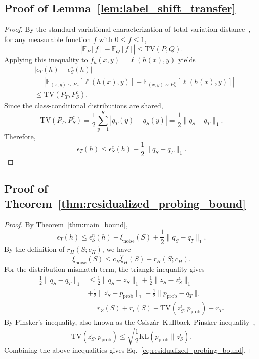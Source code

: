 \subsection{Proof of Lemma~\ref{lem:label_shift_transfer}}
\begin{proof}
By the standard variational characterization of total variation distance~\cite{gibbs2002choosing}, for any measurable function $f$ with $0\le f\le 1$,
\[
\left|
\mathbb E_P[f]-\mathbb E_Q[f]
\right|
\le
\mathrm{TV}(P,Q).
\]
Applying this inequality to $f_h(x,y)=\ell(h(x),y)$ yields
\begin{align}
&\big|\epsilon_T(h)-\epsilon_S^c(h)\big| \\
&=
\left|
\mathbb{E}_{(x,y)\sim P_T}
\left[
\ell(h(x),y)
\right]
-
\mathbb{E}_{(x,y)\sim P_S^c}
\left[
\ell(h(x),y)
\right]
\right| \\
&\le
\mathrm{TV}(P_T,P_S^c).
\end{align}
Since the class-conditional distributions are shared,
\begin{equation}
\label{eq:TV_equality}
\mathrm{TV}(P_T,P_S^c)
=
\frac{1}{2}
\sum_{y=1}^{K}
\left|
q_T(y)-\bar q_S(y)
\right|
=
\frac{1}{2}
\|\bar q_S-q_T\|_1.
\end{equation}
Therefore,
\[
\epsilon_T(h)
\le
\epsilon_S^c(h)
+
\frac{1}{2}\|\bar q_S-q_T\|_1.
\]
\end{proof}
\subsection{Proof of Theorem~\ref{thm:residualized_probing_bound}}
\begin{proof}
By Theorem~\ref{thm:main_bound},
\begin{equation}
\epsilon_T(h)
\le
\epsilon_S^n(h)
+
\xi_{\mathrm{noise}}(S)
+
\frac12\|\bar q_S-q_T\|_1.
\end{equation}
By the definition of $r_H(S;c_H)$, we have
\begin{equation}
\xi_{\mathrm{noise}}(S)
\le
c_H\widehat{\xi}_{H}(S)
+
r_H(S;c_H).
\end{equation}
For the distribution mismatch term, the triangle inequality gives
\begin{align}
\frac12\|\bar q_S-q_T\|_1
&\le
\frac12\|\bar q_S-z_S\|_1
+
\frac12\|z_S-z_S^\epsilon\|_1
\\&+
\frac12\|z_S^\epsilon-p_{\mathrm{prob}}\|_1
+
\frac12\|p_{\mathrm{prob}}-q_T\|_1\\
&=
r_Z(S)
+
r_\epsilon(S)
+
\mathrm{TV}(z_S^\epsilon,p_{\mathrm{prob}})
+
r_T.
\end{align}
By Pinsker's inequality, also known as the Csisz{\'a}r--Kullback--Pinsker inequality~\cite{pinsker1964information,csiszar1967information},
\begin{equation}
\mathrm{TV}(z_S^\epsilon,p_{\mathrm{prob}})
\le
\sqrt{
\frac12
\mathrm{KL}
\left(
p_{\mathrm{prob}}\|z_S^\epsilon
\right)
}.
\end{equation}
Combining the above inequalities gives Eq.~\eqref{eq:residualized_probing_bound}.
\end{proof}
